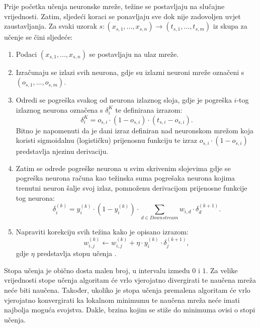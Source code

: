 Prije početka učenja neuronske mreže, težine se postavljaju na slučajne vrijednosti. Zatim, sljedeći koraci se ponavljaju sve dok nije zadovoljen uvjet zaustavljanja. Za svaki uzorak $s : (x_{s,1}, ..., x_{s,n}) \rightarrow (t_{s,1}, ..., t_{s,m})$ iz skupa za učenje se čini sljedeće:
\begin{enumerate}
  \item Podaci $(x_{s,1}, ..., x_{s,n})$ se postavljaju na ulaz mreže.
  \item Izračunaju se izlazi svih neurona, gdje su izlazni neuroni mreže označeni s $(o_{s,1}, ..., o_{s,m})$.
  \item Odredi se pogreška svakog od neurona izlaznog sloja, gdje je pogreška $i$-tog izlaznog neurona označena s $\delta_i ^ K$ te definirana izrazom:$$\delta_i ^ K = o_{s,i}\cdot (1-o_{s,i})\cdot(t_{s,i}-o_{s,i}).$$Bitno je napomenuti da je dani izraz definiran nad neuronskom mrežom koja koristi sigmoidalnu (logističku) prijenosnu funkciju te izraz $o_{s,i}\cdot(1-o_{s,i})$ predstavlja njezinu derivaciju.
  \item Zatim se odrede pogreške neurona u svim skrivenim slojevima gdje se pogreška neurona računa kao težinska suma pogrešaka neurona kojima trenutni neuron šalje svoj izlaz, pomnoženu derivacijom prijenosne funkcije tog neurona:$$\delta_i^{(k)} = y_i^{(k)}\cdot(1-y_i^{(k)})\cdot\sum_{d \in Downstream} w_{i,d}\cdot\delta_d^{(k+1)}.$$
  \item Napraviti korekciju svih težina kako je opisano izrazom:$$w_{i,j}^{(k)} \leftarrow w_{i,j}^{(k)} + \eta\cdot y_i ^ {(k)}\cdot\delta_j^{(k+1)},$$ gdje $\eta$ predstavlja stopu učenja .
\end{enumerate}

 Stopa učenja je obično dosta malen broj, u intervalu između $0$ i $1$. Za velike vrijednosti stope učenja algoritam će vrlo vjerojatno divergirati te naučena mreža neće biti naučena. Također, ukoliko je stopa učenja premalena algoritam će vrlo vjerojatno konvergirati ka lokalnom minimumu te naučena mreža neće imati najbolja moguća svojstva. Dakle, brzina kojim se stiže do minimuma ovisi o stopi učenja.
 

